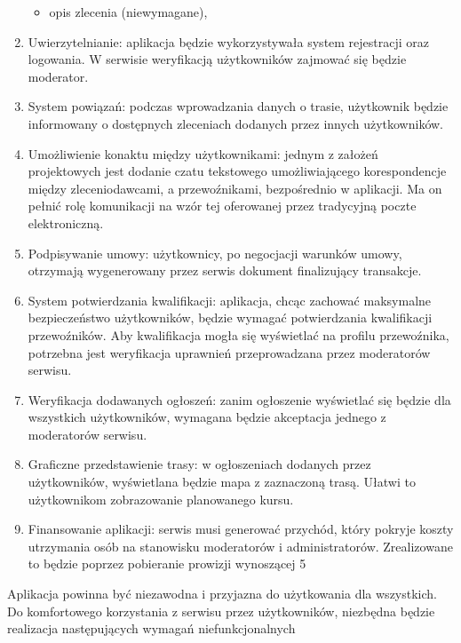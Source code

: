 \begin{enumerate}
\begin{itemize}
        \item opis zlecenia (niewymagane),
    \end{itemize}
    \item Uwierzytelnianie: aplikacja będzie wykorzystywała system rejestracji oraz logowania. W serwisie weryfikacją użytkowników zajmować się będzie moderator.
    \item System powiązań: podczas wprowadzania danych o trasie, użytkownik będzie informowany o dostępnych zleceniach dodanych przez innych użytkowników.
    \item Umożliwienie konaktu między użytkownikami: jednym z założeń projektowych jest dodanie czatu tekstowego umożliwiającego korespondencje między zleceniodawcami, a przewoźnikami, bezpośrednio w aplikacji. Ma on pełnić rolę komunikacji na wzór tej  oferowanej przez tradycyjną poczte elektroniczną.
    \item Podpisywanie umowy: użytkownicy, po negocjacji warunków umowy, otrzymają wygenerowany przez serwis dokument finalizujący transakcje.
    \item System potwierdzania kwalifikacji: aplikacja, chcąc zachować maksymalne bezpieczeństwo użytkowników, będzie wymagać potwierdzania kwalifikacji przewoźników. Aby kwalifikacja mogła się wyświetlać na profilu przewoźnika, potrzebna jest weryfikacja uprawnień przeprowadzana przez moderatorów serwisu.
    \item Weryfikacja dodawanych ogłoszeń: zanim ogłoszenie wyświetlać się będzie dla wszystkich użytkowników, wymagana będzie akceptacja jednego z moderatorów serwisu.
    \item Graficzne przedstawienie trasy: w ogłoszeniach dodanych przez użytkowników, wyświetlana będzie mapa z zaznaczoną trasą. Ułatwi to użytkownikom zobrazowanie planowanego kursu.
    \item Finansowanie aplikacji: serwis musi generować przychód, który pokryje koszty utrzymania osób na stanowisku moderatorów i administratorów. Zrealizowane to będzie poprzez pobieranie prowizji wynoszącej 5%
\end{enumerate}
Aplikacja powinna być niezawodna i przyjazna do użytkowania dla wszystkich. Do komfortowego korzystania z serwisu przez użytkowników, niezbędna będzie realizacja następujących wymagań niefunkcjonalnych
